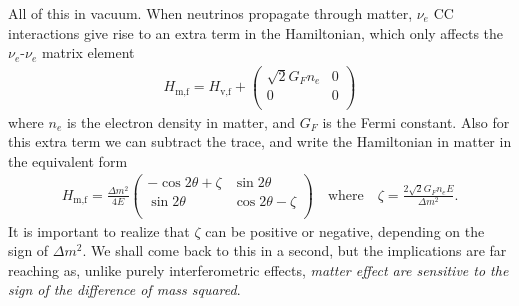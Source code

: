 All of this in vacuum. When neutrinos propagate through matter, $\nu_e$ CC interactions
give rise to an extra term in the Hamiltonian, which only affects the $\nu_e$-$\nu_e$ matrix element
\begin{align*}
  H_\text{m,f} = H_\text{v,f} +
  \begin{pmatrix}
  \sqrt{2} G_F n_e & 0\\
  0 & 0\\
\end{pmatrix}
\end{align*}
where $n_e$ is the electron density in matter, and $G_F$ is the Fermi constant.
Also for this extra term we can subtract the trace, and write the Hamiltonian in
matter in the equivalent form
\begin{align}\label{eq:msw_hamiltonian_1}
  H_\text{m,f} = \frac{\Delta m^2}{4E}
  \begin{pmatrix}
   -\cos 2\theta + \zeta & \sin 2\theta\\
   \sin 2\theta & \cos 2\theta - \zeta\\
  \end{pmatrix}
  \quad\text{where}\quad
  \zeta = \frac{2\sqrt{2}G_F n_e E}{\Delta m^2}.
\end{align}
It is important to realize that $\zeta$ can be positive or negative, depending on
the sign of $\Delta m^2$. We shall come back to this in a second, but the implications
are far reaching as, unlike purely interferometric effects, \emph{matter effect are sensitive
to the sign of the difference of mass squared}.

